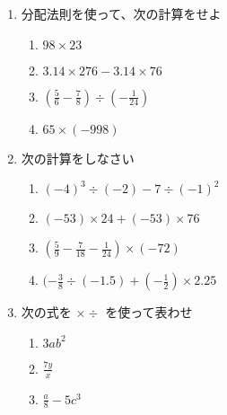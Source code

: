 \documentclass[twocolumn, fleqn]{jsarticle}
\begin{document}



  \begin{enumerate}
    \item 分配法則を使って、次の計算をせよ 

      \begin{enumerate}
        \item  $ 98 \times 23$
          \vfill
        \item  $ 3.14 \times 276 - 3.14 \times 76$
          \vfill
        \item  $(\frac{5}{6} - \frac{7}{8}) \div (- \frac{1}{24})$
          \vfill
        \item $65 \times (-998)$
          \vfill
      \end{enumerate}

      \item 次の計算をしなさい
        \begin{enumerate}
          \item $ (-4)^3 \div (-2) -7 \div (-1)^2$
            \vfill

        \item $(-53) \times 24 + (-53) \times 76$
          \vfill
        \item $( \frac{5}{9}- \frac{7}{18} -\frac{1}{24}) \times (-72)$
          \vfill
        \item $(- \frac{3}{8} \div(-1.5) + (-\frac{1}{2}) \times 2.25$
          \vfill
      \end{enumerate}

    \newpage
    \item 次の式を $ \times \div $ を使って表わせ
      \begin{enumerate}
          \item $3ab^2$
            \vfill
          \item $ \frac{7y}{x} $
            \vfill
          \item $ \frac{a}{8} - 5c^3$
            \vfill
        \end{enumerate}
              

\end{enumerate}
\end{document}
